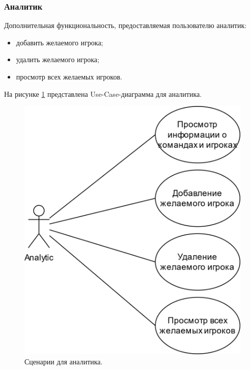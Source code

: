 \subsubsection{Аналитик}
Дополнительная функциональность, предоставляемая пользователю аналитик:
\begin{itemize}
	\item[1)] добавить желаемого игрока;
	\item[2)] удалить желаемого игрока;
	\item[3)] просмотр всех желаемых игроков.  
\end{itemize}
На рисунке \ref{img:UseCaseAnalytic} представлена Use-Case-диаграмма для аналитика.
\begin{figure}[h!]
	\centering
	\includegraphics[scale=0.35]{img/UseCaseAnalytic.png}
	\caption{Сценарии для аналитика.}
	\label{img:UseCaseAnalytic}
\end{figure}
